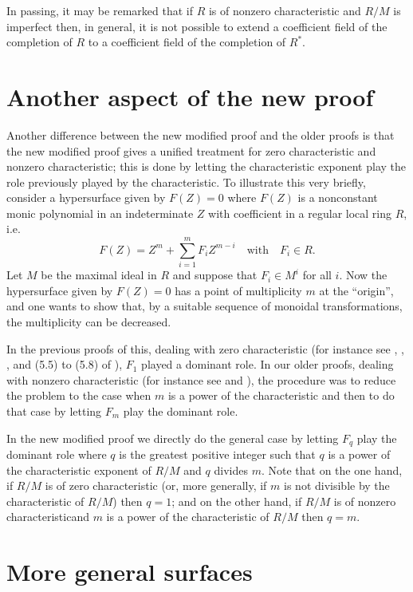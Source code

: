 In passing, it may be remarked that if $R$ is of nonzero characteristic and $R/M$ is imperfect then, in general, it is not possible to extend a coefficient field of the completion of $R$ to a coefficient field of the completion of $R^{*}$.

\section{Another aspect of the new proof}\label{art01-sec4}

Another difference between the new modified proof and the older proofs is that the new modified proof gives a unified treatment for zero characteristic and nonzero characteristic; this is done by letting the characteristic exponent play the role previously played by the characteristic. To illustrate this very briefly, consider a hypersurface given by $F(Z)=0$ where $F(Z)$ is a nonconstant monic polynomial in an indeterminate $Z$ with coefficient in a regular local ring $R$, i.e.
$$
F(Z)=Z^{m}+\sum\limits^{m}_{i=1}F_{i}Z^{m-i}\quad\text{with}\quad F_{i}\in R.
$$
Let $M$ be the maximal ideal in $R$ and suppose that $F_{i}\in M^{i}$ for all $i$. Now the hypersurface given by $F(Z)=0$ has a point of multiplicity $m$ at the ``origin'', and one wants to show that, by a suitable sequence of monoidal transformations, the multiplicity can be decreased.

In the previous proofs of this, dealing with zero characteristic (for instance see \cite{art01-key16}, \cite{art01-key18}, \cite{art01-key12}, and (5.5) to (5.8) of \cite{art01-key10}), $F_{1}$ played a dominant role. In our older proofs, dealing with nonzero characteristic (for instance see \cite{art01-key9} and \cite{art01-key11}), the procedure was to reduce the problem to the case when $m$ is a power of the characteristic and then to do that case by letting $F_{m}$ play the dominant role.

In the new modified proof we directly do the general case by letting $F_{q}$ play the dominant role where $q$ is the greatest positive integer such that $q$ is a power of the characteristic exponent of $R/M$ and $q$ divides $m$. Note that on the one hand, if $R/M$ is of zero characteristic (or, more generally, if $m$ is not divisible by the characteristic of $R/M$) then $q=1$; and on the other hand, if $R/M$ is of nonzero characteristic\pageoriginale and $m$ is a power of the characteristic of $R/M$ then $q=m$.

\section{More general surfaces}\label{art01-sec5}

